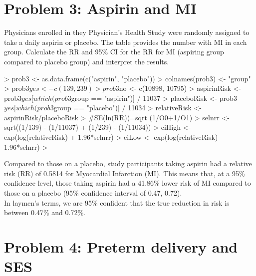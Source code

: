 \documentclass[12pt]{article}
\begin{document}
\newpage
\section*{Problem 3: Aspirin and MI}

\textcolor{black!50}{Physicians enrolled in they Physician's Health Study were randomly assigned to take a daily aspirin or placebo.  The table provides the number with MI in each group.  Calculate the RR and 95\% CI for the RR for MI (aspiring group compared to placebo group) and interpret the results.  \\}

\begin{Schunk}
\begin{Sinput}
> prob3 <- as.data.frame(c("aspirin", "placebo"))
> colnames(prob3) <- "group"
> prob3$yes <- c(139, 239)
> prob3$no <- c(10898, 10795)
> aspirinRisk <- prob3$yes[which(prob3$group == "aspirin")] / 11037
> placeboRisk <- prob3$yes[which(prob3$group == "placebo")] / 11034
> relativeRisk <- aspirinRisk/placeboRisk
> #SE(ln(RR))=sqrt (1/O0+1/O1)
> selnrr <- sqrt((1/139) - (1/11037) + (1/239) - (1/11034))
> ciHigh <- exp(log(relativeRisk) + 1.96*selnrr)
> ciLow <- exp(log(relativeRisk) - 1.96*selnrr)
> 
\end{Sinput}
\end{Schunk}

\noindent Compared to those on a placebo, study participants taking aspirin had a relative risk (RR) of 0.5814 for Myocardial Infarction (MI).  This means that, at a 95\% confidence level, those taking aspirin had a 41.86\% lower risk of MI compared to those on a placebo (95\% confidence interval of 0.47, 0.72).  \\

\noindent In laymen's terms, we are 95\% confident that the true reduction in risk is between 0.47\% and 0.72\%. 

\section*{Problem 4: Preterm delivery and SES}
\end{document}
